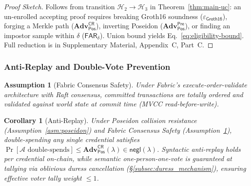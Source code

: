 \documentclass[10pt,letterpaper,journal]{IEEEtran}
\newtheorem{corollary}[theorem]{Corollary}
\newtheorem{assumption}[theorem]{Assumption}
\begin{document}
\begin{proof}[Proof Sketch]
Follows from transition $\mathcal{H}_2 \rightarrow \mathcal{H}_3$ in Theorem~\ref{thm:main-uc}: an un-enrolled accepting proof requires breaking Groth16 soundness ($\varepsilon_{\mathsf{Groth16}}$), forging a Merkle path ($\mathbf{Adv}_{\mathsf{Pos}}^{\mathsf{CR}}$), inverting Poseidon ($\mathbf{Adv}_{\mathsf{Pos}}^{\mathsf{Pre}}$), or finding an impostor sample within $\delta$ ($\mathsf{FAR}_\delta$). Union bound yields Eq.~\eqref{eq:eligibility-bound}. Full reduction is in Supplementary Material, Appendix~C, Part~C.
\end{proof}

\subsubsection{Anti-Replay and Double-Vote Prevention}
\label{sec:antireplay}

\begin{assumption}[Fabric Consensus Safety]
\label{asm:fabric}
Under Fabric's execute-order-validate architecture with Raft consensus, committed transactions are totally ordered and validated against world state at commit time (MVCC read-before-write).
\end{assumption}

\begin{corollary}[Anti-Replay]
\label{thm:antireplay}
Under Poseidon collision resistance (Assumption~\ref{asm:poseidon}) and Fabric Consensus Safety (Assumption~\ref{asm:fabric}), double-spending any single credential satisfies $\Pr[\mathcal{A}\text{ double-spends}] \leq \mathbf{Adv}^{\mathsf{CR}}_{\mathsf{Pos}}(\lambda) \in \mathsf{negl}(\lambda)$. Syntactic anti-replay holds per credential on-chain, while semantic one-person-one-vote is guaranteed at tallying via oblivious duress cancellation (\S\ref{subsec:duress_mechanism}), ensuring effective voter tally weight $\leq 1$.
\end{corollary}
\end{document}
